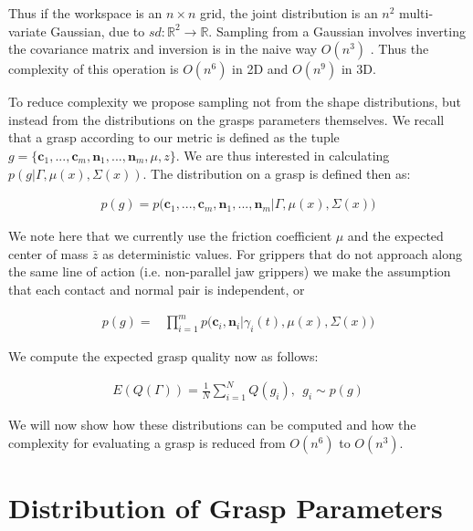 \documentclass[letterpaper, 10 pt, conference]{ieeeconf}  %
\begin{document}
Thus if the workspace is an $n \times n$ grid, the joint distribution is an  $n^2$ multi-variate Gaussian, due to $sd:\mathbb{R}^2 \rightarrow \mathbb{R}$.  Sampling from a Gaussian involves inverting the covariance matrix and inversion is in the naive way $O(n^3)$ \cite{petersen2008matrix}. Thus the complexity of this operation is $O(n^6)$ in 2D and $O(n^9)$ in 3D. 

To reduce complexity we propose sampling not from the shape distributions, but instead from the distributions on the grasps parameters themselves. We recall that a grasp according to our metric is defined as the tuple $g = \lbrace \textbf{c}_1,...,\textbf{c}_m,\textbf{n}_1,...,\textbf{n}_m,\mu, z \rbrace$. We are thus interested in calculating $p(g|\Gamma,\mu(x),\Sigma(x))$. The distribution on a grasp is defined then as: 

\begin{align}\label{eq:joint_on_shape}
p(g) = p\big(\textbf{c}_1,...,\textbf{c}_m,\textbf{n}_1,...,\textbf{n}_m|\Gamma,\mu(x),\Sigma(x)\big)
\end{align}

We note here that we currently use the friction coefficient $\mu$ and the expected center of mass $\bar{z}$ as deterministic values. For grippers that do not approach along the same line of action (i.e. non-parallel jaw grippers) we make the assumption that each contact and normal pair is independent, or 

\vspace{-2ex}
\begin{align}\label{eq:independence}
p(g) = &\prod_{i=1}^mp\big(\textbf{c}_i,\textbf{n}_i|\gamma_i(t),\mu(x),\Sigma(x)\big)
\end{align}



We compute the expected grasp quality now as follows: 

\vspace{-2ex}
\begin{align}\label{eq:grasp_sampling}
E(Q(\Gamma)) = \frac{1}{N} \sum_{i=1}^N Q(g_i) , \ \ g_i \sim p(g)
\end{align}


We will now show how these distributions can be computed and how the complexity for evaluating a grasp is reduced from $O(n^6)$ to $O(n^3)$. 


\section{Distribution of Grasp Parameters}
\label{sec:distgrasp}
 
\end{document}
